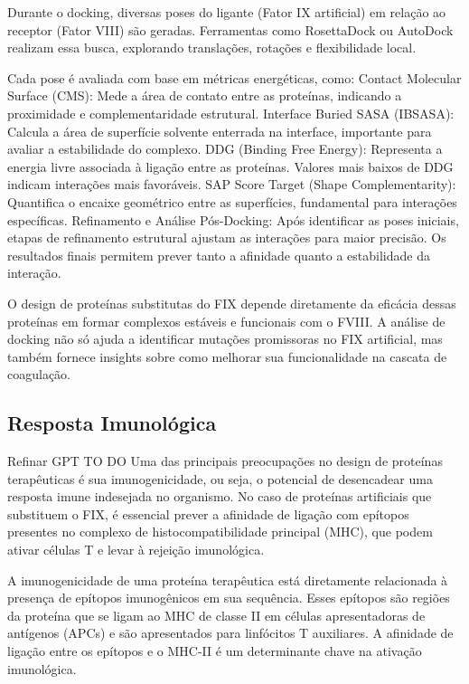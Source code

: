 Durante o docking, diversas poses do ligante (Fator IX artificial) em relação ao receptor (Fator VIII) são geradas.
Ferramentas como RosettaDock ou AutoDock realizam essa busca, explorando translações, rotações e flexibilidade local.

Cada pose é avaliada com base em métricas energéticas, como:
Contact Molecular Surface (CMS): Mede a área de contato entre as proteínas, indicando a proximidade e complementaridade estrutural.
Interface Buried SASA (IBSASA): Calcula a área de superfície solvente enterrada na interface, importante para avaliar a estabilidade do complexo.
DDG (Binding Free Energy): Representa a energia livre associada à ligação entre as proteínas. Valores mais baixos de DDG indicam interações mais favoráveis.
SAP Score Target (Shape Complementarity): Quantifica o encaixe geométrico entre as superfícies, fundamental para interações específicas.
Refinamento e Análise Pós-Docking:
Após identificar as poses iniciais, etapas de refinamento estrutural ajustam as interações para maior precisão. Os resultados finais permitem prever tanto a afinidade quanto a estabilidade da interação.

O design de proteínas substitutas do FIX depende diretamente da eficácia dessas proteínas em formar complexos estáveis e funcionais com o FVIII. 
A análise de docking não só ajuda a identificar mutações promissoras no FIX artificial,
mas também fornece insights sobre como melhorar sua funcionalidade na cascata de coagulação.



\subsection{Resposta Imunológica}
{\color{red} Refinar GPT}
{\color{red} TO DO}
Uma das principais preocupações no design de proteínas terapêuticas é sua imunogenicidade, ou seja,
o potencial de desencadear uma resposta imune indesejada no organismo.
No caso de proteínas artificiais que substituem o FIX, 
é essencial prever a afinidade de ligação com epítopos presentes no complexo de histocompatibilidade principal (MHC),
que podem ativar células T e levar à rejeição imunológica.


A imunogenicidade de uma proteína terapêutica está diretamente relacionada à presença de epítopos imunogênicos em sua sequência.
Esses epítopos são regiões da proteína que se ligam ao MHC de classe II em células apresentadoras de antígenos (APCs) e são apresentados para linfócitos T auxiliares.
A afinidade de ligação entre os epítopos e o MHC-II é um determinante chave na ativação imunológica.

